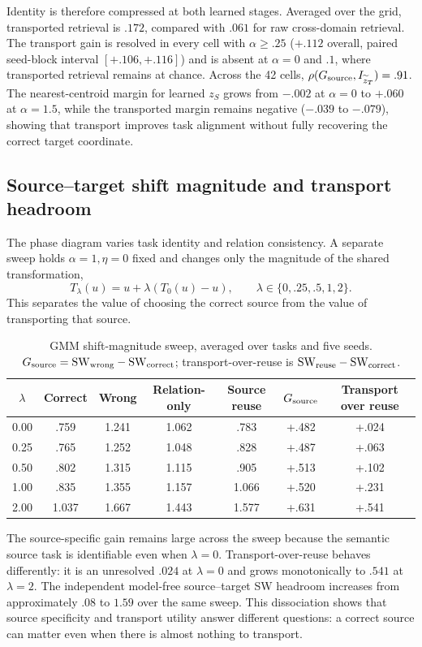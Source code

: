 Identity is therefore compressed at both learned stages. Averaged over the grid, transported retrieval is $.172$, compared with $.061$ for raw cross-domain retrieval. The transport gain is resolved in every cell with $\alpha\geq.25$ ($+.112$ overall, paired seed-block interval $[+.106,+.116]$) and is absent at $\alpha=0$ and $.1$, where transported retrieval remains at chance. Across the 42 cells, $\rho(G_{\rm source},I_{\widetilde z_T})=.91$. The nearest-centroid margin for learned $z_S$ grows from $-.002$ at $\alpha=0$ to $+.060$ at $\alpha=1.5$, while the transported margin remains negative ($-.039$ to $-.079$), showing that transport improves task alignment without fully recovering the correct target coordinate.

\subsection{Source--target shift magnitude and transport headroom}

The phase diagram varies task identity and relation consistency. A separate sweep holds $\alpha=1,\eta=0$ fixed and changes only the magnitude of the shared transformation,
\[
T_\lambda(u)=u+\lambda(T_0(u)-u),
\qquad
\lambda\in\{0,.25,.5,1,2\}.
\]
This separates the value of choosing the correct source from the value of transporting that source.

\begin{table}[h]
\centering\small
\caption{GMM shift-magnitude sweep, averaged over tasks and five seeds. $G_{\rm source}=\mathrm{SW}_{\rm wrong}-\mathrm{SW}_{\rm correct}$; transport-over-reuse is $\mathrm{SW}_{\rm reuse}-\mathrm{SW}_{\rm correct}$.}
\begin{tabular}{ccccccc}
\toprule
$\lambda$ & Correct & Wrong & Relation-only & Source reuse & $G_{\rm source}$ & Transport over reuse\\
\midrule
0.00 & .759 & 1.241 & 1.062 & .783 & +.482 & +.024\\
0.25 & .765 & 1.252 & 1.048 & .828 & +.487 & +.063\\
0.50 & .802 & 1.315 & 1.115 & .905 & +.513 & +.102\\
1.00 & .835 & 1.355 & 1.157 & 1.066 & +.520 & +.231\\
2.00 & 1.037 & 1.667 & 1.443 & 1.577 & +.631 & +.541\\
\bottomrule
\end{tabular}
\end{table}

The source-specific gain remains large across the sweep because the semantic source task is identifiable even when $\lambda=0$. Transport-over-reuse behaves differently: it is an unresolved $.024$ at $\lambda=0$ and grows monotonically to $.541$ at $\lambda=2$. The independent model-free source--target SW headroom increases from approximately $.08$ to $1.59$ over the same sweep. This dissociation shows that source specificity and transport utility answer different questions: a correct source can matter even when there is almost nothing to transport.


